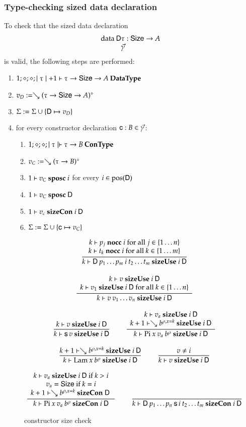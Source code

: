 \subsubsection{Type-checking sized data declaration}

To check that the sized data declaration
\[\begin{array}{l}
\data \DD \tau : \Size \ra A \\
\spcx \vec{\gamma}
\end{array}
\]
is valid, the following steps are performed: 
\begin{enumerate}
\item
$1;\diamond;\diamond;\mid\tau\mid+1\vdash\tau \rightarrow \mathsf{Size} \rightarrow A\:\mathbf{Data Type}$
\item
$v_D := \searrow (\tau \rightarrow \mathsf{Size} \rightarrow A)^{\diamond}$
\item
$\mathrm{\Sigma} := \mathrm{\Sigma} \cup \{\mathsf{D} \mapsto v_D\}$
\item
for every constructor declaration $\mathsf{c} : B  \in \vec{\gamma}$:
\begin{enumerate} 
\item
$1;\diamond;\diamond;\mid\tau\mid\vdash\tau \rightarrow B\:\mathbf{Con Type}$
\item
$v_C := \searrow (\tau \rightarrow B)^{\diamond}$
\item
$1\vdash v_C\mbox{ \textbf{sposc} }i$ for every $i \in \mbox{pos}(\mathsf{D}) $ 
\item
$1\vdash v_C\mbox{ \textbf{sposc} }\mathsf{D}$
\item
$1\vdash v_c\mbox{ \textbf{sizeCon} }i\:\mathsf{D}$
\item
$\mathrm{\Sigma} := \mathrm{\Sigma} \cup \{\mathsf{c} \mapsto v_C\}$
\end{enumerate}
\end{enumerate}

\begin{figure}
\begin{gather*}
\ \dfrac{\begin{array}[b]{c}k\vdash p_j\mbox{ \textbf{nocc} }i \mbox { for all } j \in \{ 1 \ldots n\}\\k\vdash t_k\mbox{ \textbf{nocc} }i \mbox { for all } k \in \{ 1 \ldots m\}\end{array}}{k\vdash\mathsf{D} \: p_1 \ldots p_m \: i \: t_2 \ldots t_m\mbox{ \textbf{sizeUse} }i\:\mathsf{D}}
\\[2ex]
\ \dfrac{\begin{array}[b]{c}k\vdash v\mbox{ \textbf{sizeUse} }i\:\mathsf{D}\\k\vdash v_1\mbox{ \textbf{sizeUse} }i\:\mathsf{D} \mbox { for all } k \in \{ 1 \ldots n\}\end{array}}{k\vdash v \: v_1 \ldots v_n\mbox{ \textbf{sizeUse} }i\:\mathsf{D}}
\\[2ex]
\ \dfrac{k\vdash v\mbox{ \textbf{sizeUse} }i\:\mathsf{D}}{k\vdash\mathsf{s}\, v\mbox{ \textbf{sizeUse} }i\:\mathsf{D}}
\qquad
\ \dfrac{\begin{array}[b]{c}k\vdash v_a\mbox{ \textbf{sizeUse} }i\:\mathsf{D}\\k+1\vdash\searrow b^{\rho,x=k}\mbox{ \textbf{sizeUse} }i\:\mathsf{D}\end{array}}{k\vdash\mathrm{Pi} \: x \: v_a \: b^{\rho}\mbox{ \textbf{sizeUse} }i\:\mathsf{D}}
\\[2ex]
\ \dfrac{k+1\vdash\searrow b^{\rho,x=k}\mbox{ \textbf{sizeUse} }i\:\mathsf{D}}{k\vdash\mathrm{Lam} \: x \: b^{\rho}\mbox{ \textbf{sizeUse} }i\:\mathsf{D}}
\qquad
\ \dfrac{v \neq i}{k\vdash v\mbox{ \textbf{sizeUse} }i\:\mathsf{D}}
\\[2ex]
\ \dfrac{\begin{array}[b]{c}k\vdash v_a\mbox{ \textbf{sizeUse} }i\:\mathsf{D} \mbox{ if } k > i\\v_a = \mathsf{Size} \mbox { if } k = i \\k+1\vdash\searrow b^{\rho,x=k}\mbox{ \textbf{sizeCon} }\mathsf{D}\:\end{array}}{k\vdash\mathrm{Pi} \: x \: v_a \: b^{\rho}\mbox{ \textbf{sizeCon} }i\:\mathsf{D}}
\qquad
\ \dfrac{}{k\vdash\mathsf{D} \:p_1 \ldots p_n \: \mathsf{s}\, i \:t_2 \ldots t_m\mbox{ \textbf{sizeCon} }i\:\mathsf{D}}
\end{gather*}
\caption{constructor size check}
\end{figure}

